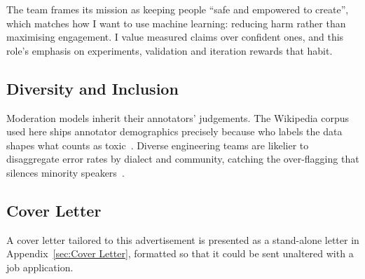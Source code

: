 The team frames its mission as keeping people ``safe and empowered to create'', which
matches how I want to use machine learning: reducing harm rather than maximising
engagement. I value measured claims over confident ones, and this role's emphasis on
experiments, validation and iteration rewards that habit.


\subsection{Diversity and Inclusion}
\label{subsec:Diversity and Inclusion}

Moderation models inherit their annotators' judgements. The Wikipedia corpus used here
ships annotator demographics precisely because who labels the data shapes what counts as
toxic~\cite{wulczyn2017ex}. Diverse engineering teams are likelier to disaggregate error
rates by dialect and community, catching the over-flagging that silences minority
speakers~\cite{sap2019risk}.


\subsection{Cover Letter}
\label{subsec:Cover Letter}

A cover letter tailored to this advertisement is presented as a stand-alone letter in
Appendix~\ref{sec:Cover Letter}, formatted so that it could be sent unaltered with a job
application.

